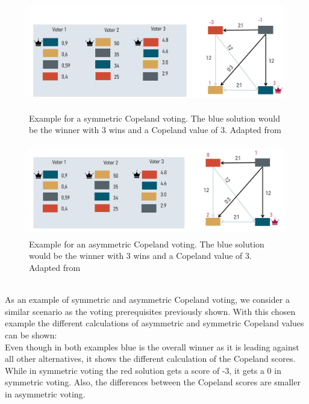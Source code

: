 \documentclass[german, a4paper, 11pt, oneside]{scrbook}
\begin{document}
\begin{figure}[h]
\centering
\includegraphics[height=4.4cm]{Copeland}
\caption{Example for a symmetric Copeland voting. The blue solution would be the winner with 3 wins and a Copeland value of 3. Adapted from \cite{Bhavnani.2022b} }
\includegraphics[height=4cm]{Copeland_asym}
\caption{Example for an asymmetric Copeland voting. The blue solution would be the winner with 3 wins and a Copeland value of 3. Adapted from \cite{Bhavnani.2022b}}
\end{figure}
\\
As an example of symmetric and asymmetric Copeland voting, we consider a similar scenario as the voting prerequisites previously shown. With this chosen example the different calculations of asymmetric and symmetric Copeland values can be shown:
\\Even though in both examples blue is the overall winner as it is leading against all other alternatives, it shows the different calculation of the Copeland scores. While in symmetric voting the red solution gets a score of -3, it gets a 0 in symmetric voting. Also, the differences between the Copeland scores are smaller in asymmetric voting.
\end{document}

